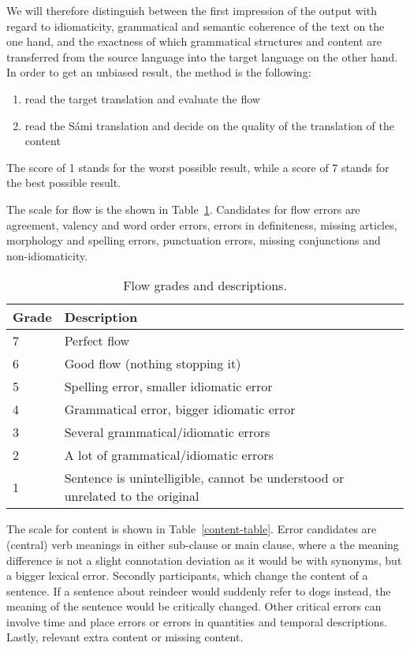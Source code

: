 \documentclass{flammie}
\begin{document}
We will therefore distinguish between the first impression of the output with
regard to idiomaticity, grammatical and semantic coherence of the text on the
one hand, and the exactness of which grammatical structures and content are
transferred from the source language into the target language on the other hand.
In order to get an unbiased result, the method is the following:

\begin{enumerate}
    \item read the target translation and evaluate the flow
    \item read the Sámi translation and decide on the quality of the translation
        of the content
\end{enumerate}

The score of 1 stands for the worst possible result, while a score of 7 stands
for the best possible result.

The scale for flow is the shown in Table~\ref{flow-table}.  Candidates for flow
errors are agreement, valency and word order errors, errors in definiteness,
missing articles, morphology and spelling errors, punctuation errors, missing
conjunctions and non-idiomaticity.


\begin{table}[h]
\small
\begin{center}
\begin{tabular}{lp{6cm}}
\toprule
    \bf Grade & \bf Description \\
    \midrule
7 & Perfect flow \\
6 & Good flow (nothing stopping it) \\
5 & Spelling error, smaller idiomatic error \\
4 & Grammatical error, bigger idiomatic error \\
3 & Several grammatical/idiomatic errors\\
2 & A lot of grammatical/idiomatic errors \\
1 & Sentence is unintelligible, cannot be understood or unrelated to the original \\
\bottomrule
\end{tabular}
\end{center}
\caption{\label{flow-table} Flow grades and descriptions.}
\end{table}


The scale for content is shown in Table~\ref{content-table}.  Error candidates
are (central) verb meanings in either sub-clause or  main clause, where a the
meaning difference is not a slight connotation deviation as it would be with
synonyms, but a bigger lexical error.  Secondly participants, which change the
content of a sentence. If a sentence about reindeer would suddenly refer to dogs
instead, the meaning of the sentence would be critically changed. Other critical
errors can involve time and place errors or errors in quantities and temporal
descriptions. Lastly, relevant extra content or missing content.
\end{document}
